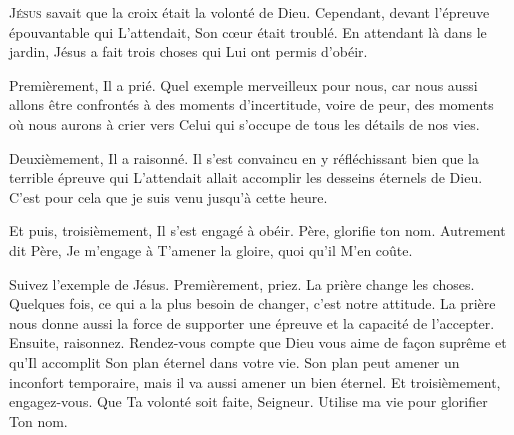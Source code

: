 \dvrule






\lettrine{J}{ésus} savait que la croix était la volonté de Dieu.
 Cependant, devant l'épreuve épouvantable qui L'attendait,
 Son c\oe{}ur était troublé. En attendant là dans le jardin,
 Jésus a fait trois choses qui Lui ont permis d'obéir.

Premièrement, Il a prié. Quel exemple merveilleux pour nous,
 car nous aussi allons être confrontés à des moments d'incertitude,
 voire de peur, des moments où nous aurons à crier vers Celui
 qui s'occupe de tous les détails de nos vies.


Deuxièmement, Il a raisonné. Il s'est convaincu en y réfléchissant
 bien que la terrible épreuve qui L'attendait allait accomplir
 les desseins éternels de Dieu.
 \Og C'est pour cela que je suis venu jusqu'à cette heure. \Fg{}

Et puis, troisièmement, Il s'est engagé à obéir.
 \Og Père, glorifie ton nom. \Fg{}
 Autrement dit\frcolon{} 
 \Og Père, Je m'engage à T'amener la gloire, quoi qu'il M'en coûte. \Fg{}

Suivez l'exemple de Jésus. Premièrement, priez.
 La prière change les choses. Quelques fois, 
 ce qui a la plus besoin de changer, c'est notre attitude.
 La prière nous donne aussi la force de supporter une épreuve
 et la capacité de l'accepter. Ensuite, raisonnez. 
 Rendez-vous compte que Dieu vous aime de fa\c{c}on suprême et qu'Il accomplit
 Son plan éternel dans votre vie.
 Son plan peut amener un inconfort temporaire, mais il va aussi amener
 un bien éternel. Et troisièmement, engagez-vous.
 \Og Que Ta volonté soit faite, Seigneur.
 Utilise ma vie pour glorifier Ton nom. \Fg{}

\dvrule



